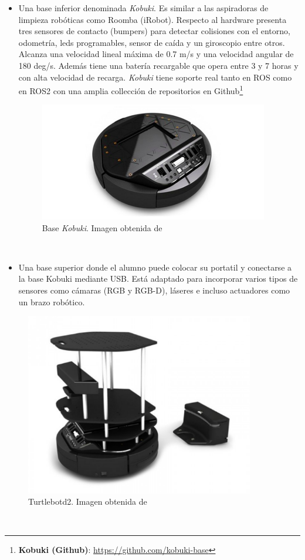 \begin{itemize}
	\item Una base inferior denominada \textit{Kobuki}. Es similar a las aspiradoras de limpieza robóticas como Roomba (iRobot). Respecto al hardware presenta tres sensores de contacto (bumpers) para detectar colisiones con el entorno, odometría, leds programables, sensor de caída y un giroscopio entre otros. Alcanza una velocidad lineal máxima de 0.7 m/s y una velocidad angular de 180 deg/s. Además tiene una batería recargable que opera entre 3 y 7 horas y con alta velocidad de recarga. \textit{Kobuki} tiene soporte real tanto en ROS como en ROS2 con una amplia collección de repositorios en Github\footnote{\textbf{Kobuki (Github)}: \url{https://github.com/kobuki-base}}
\begin{figure} [H]
	\begin{center}
	\includegraphics[width=10cm]{imagenes/cap3/base-kobuki.png}
	\end{center}
	\caption[Base Kobuki]{Base \textit{Kobuki}. Imagen obtenida de \cite{kobuki}}
	\label{fig:kobuki_real}
\end{figure}\
	\item Una base superior donde el alumno puede colocar su portatil y conectarse a la base Kobuki mediante USB. Está adaptado para incorporar varios tipos de sensores como cámaras (RGB y RGB-D), láseres e incluso actuadores como un brazo robótico.
\end{itemize}

\begin{figure} [H]
  \begin{center}
    \includegraphics[width=10cm]{imagenes/cap3/turtlebot2-real.png}
  \end{center}
  \caption[Turtlebot2]{Turtlebotd2. Imagen obtenida de \cite{turtlebot2}}
  \label{fig:turtlebot2_real}
\end{figure}\

